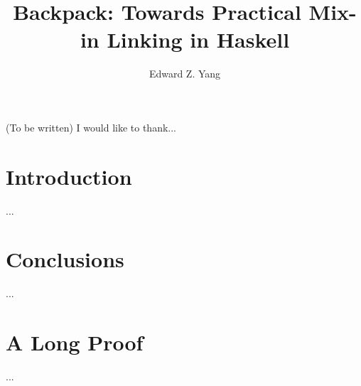 \documentclass{report}
\begin{document}
\title{Backpack: Towards Practical Mix-in Linking in Haskell}
\author{Edward Z. Yang}

\beforepreface
{}
    (To be written)
    I would like to thank...
\afterpreface

\chapter{Introduction}
     ...
\chapter{Conclusions}
     ...
\appendix
\chapter{A Long Proof}
     ...


\end{document}
